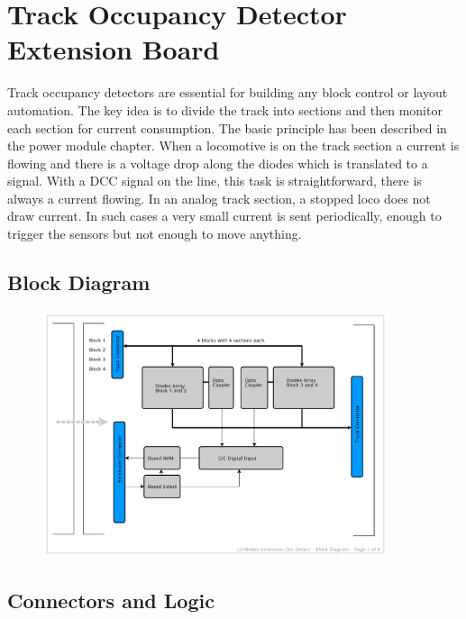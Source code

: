 \chapter{Track Occupancy Detector Extension Board}

Track occupancy detectors are essential for building any block control or layout automation. The key idea is to divide the track into sections and then monitor each section for current consumption. The basic principle has been described in the power module chapter. When a locomotive is on the track section a current is flowing and there is a voltage drop along the diodes which is translated to a signal. With a DCC signal on the line, this task is straightforward, there is always a current flowing. In an analog track section, a stopped loco does not draw current. In such cases a very small current is sent periodically, enough to trigger the sensors but not enough to move anything.

\section{Block Diagram}

\begin{figure}[htbp]
    \centering
    \includegraphics[page=1, width=0.9\textwidth]{./Schematics/Schematic_LcsNodes-Extension-Occ-Detect.pdf}
\end{figure}
\FloatBarrier

\section{Connectors and Logic}


